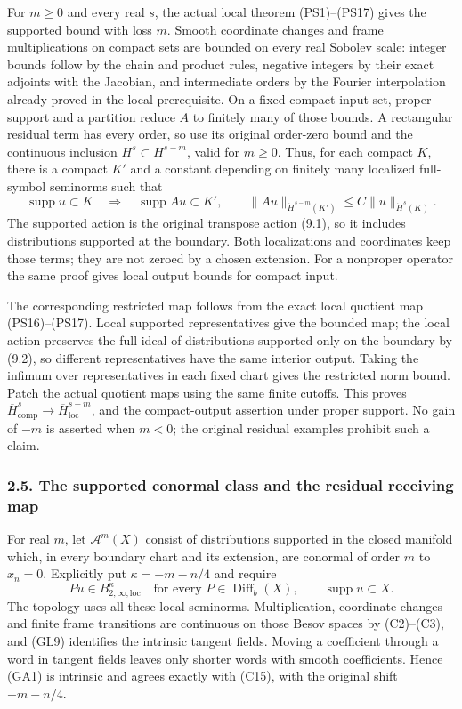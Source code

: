 \documentclass[
  11pt,
]{article}
\begin{document}
For \(m\ge0\) and every real \(s\), the actual local theorem
(PS1)--(PS17) gives the supported bound with loss \(m\). Smooth
coordinate changes and frame multiplications on compact sets are bounded
on every real Sobolev scale: integer bounds follow by the chain and
product rules, negative integers by their exact adjoints with the
Jacobian, and intermediate orders by the Fourier interpolation already
proved in the local prerequisite. On a fixed compact input set, proper
support and a partition reduce \(A\) to finitely many of those bounds. A
rectangular residual term has every order, so use its original
order-zero bound and the continuous inclusion \(H^s\subset H^{s-m}\),
valid for \(m\ge0\). Thus, for each compact \(K\), there is a compact
\(K'\) and a constant depending on finitely many localized full-symbol
seminorms such that \[
 \operatorname{supp}u\subset K\quad\Longrightarrow\quad
 \operatorname{supp}Au\subset K',\qquad
 \|Au\|_{\dot H^{s-m}(K')}
       \le C\|u\|_{\dot H^s(K)}.
 \tag{GC14}
\] The supported action is the original transpose action (9.1), so it
includes distributions supported at the boundary. Both localizations and
coordinates keep those terms; they are not zeroed by a chosen extension.
For a nonproper operator the same proof gives local output bounds for
compact input.

The corresponding restricted map follows from the exact local quotient
map (PS16)--(PS17). Local supported representatives give the bounded
map; the local action preserves the full ideal of distributions
supported only on the boundary by (9.2), so different representatives
have the same interior output. Taking the infimum over representatives
in each fixed chart gives the restricted norm bound. Patch the actual
quotient maps using the same finite cutoffs. This proves
\(\overline H^s_{\mathrm{comp}}\to\overline H^{s-m}_{\mathrm{loc}}\),
and the compact-output assertion under proper support. No gain of \(-m\)
is asserted when \(m<0\); the original residual examples prohibit such a
claim.

\subsubsection{2.5. The supported conormal class and the residual
receiving
map}\label{the-supported-conormal-class-and-the-residual-receiving-map}

For real \(m\), let \(\mathcal A^m(X)\) consist of distributions
supported in the closed manifold which, in every boundary chart and its
extension, are conormal of order \(m\) to \(x_n=0\). Explicitly put
\(\kappa=-m-n/4\) and require \[
 Pu\in B^\kappa_{2,\infty,\mathrm{loc}}
 \quad\text{for every }P\in\operatorname{Diff}_b(X),
 \qquad \operatorname{supp}u\subset X.
 \tag{GA1}
\] The topology uses all these local seminorms. Multiplication,
coordinate changes and finite frame transitions are continuous on those
Besov spaces by (C2)--(C3), and (GL9) identifies the intrinsic tangent
fields. Moving a coefficient through a word in tangent fields leaves
only shorter words with smooth coefficients. Hence (GA1) is intrinsic
and agrees exactly with (C15), with the original shift \(-m-n/4\).
\end{document}
